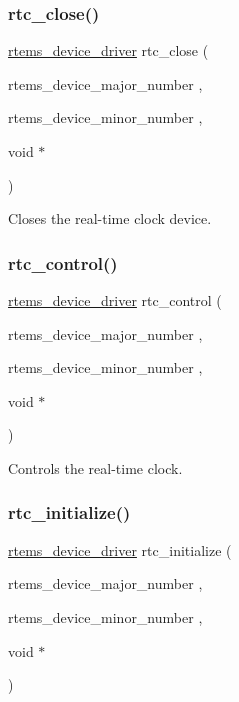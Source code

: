 \subsubsection{\texorpdfstring{rtc\_close()}{rtc\_close()}}
{\footnotesize\ttfamily \mbox{\hyperlink{group__ClassicStatus_ga545d41846817eaba6143d52ee4d9e9fe}{rtems\+\_\+device\+\_\+driver}} rtc\+\_\+close (\begin{DoxyParamCaption}\item[{rtems\+\_\+device\+\_\+major\+\_\+number}]{,  }\item[{rtems\+\_\+device\+\_\+minor\+\_\+number}]{,  }\item[{void $\ast$}]{ }\end{DoxyParamCaption})}

Closes the real-\/time clock device. \mbox{\label{group__rtems__rtc_ga0bfcc2d4bb0e86104e8b6055d1614fef}} 
\subsubsection{\texorpdfstring{rtc\_control()}{rtc\_control()}}
{\footnotesize\ttfamily \mbox{\hyperlink{group__ClassicStatus_ga545d41846817eaba6143d52ee4d9e9fe}{rtems\+\_\+device\+\_\+driver}} rtc\+\_\+control (\begin{DoxyParamCaption}\item[{rtems\+\_\+device\+\_\+major\+\_\+number}]{,  }\item[{rtems\+\_\+device\+\_\+minor\+\_\+number}]{,  }\item[{void $\ast$}]{ }\end{DoxyParamCaption})}

Controls the real-\/time clock. \mbox{\label{group__rtems__rtc_ga2ae314f2070b5f983cab0a77c5ee0126}} 
\subsubsection{\texorpdfstring{rtc\_initialize()}{rtc\_initialize()}}
{\footnotesize\ttfamily \mbox{\hyperlink{group__ClassicStatus_ga545d41846817eaba6143d52ee4d9e9fe}{rtems\+\_\+device\+\_\+driver}} rtc\+\_\+initialize (\begin{DoxyParamCaption}\item[{rtems\+\_\+device\+\_\+major\+\_\+number}]{,  }\item[{rtems\+\_\+device\+\_\+minor\+\_\+number}]{,  }\item[{void $\ast$}]{ }\end{DoxyParamCaption})}

